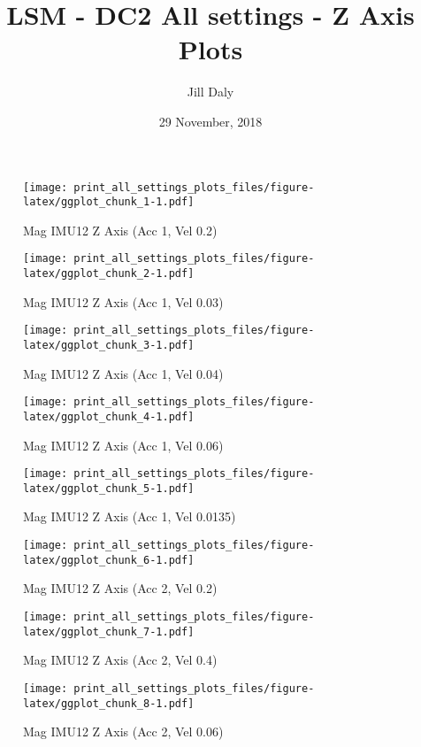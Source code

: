 \documentclass[]{article}
\title{LSM - DC2 All settings - Z Axis Plots}
\author{Jill Daly}
\date{29 November, 2018}
\begin{document}
\maketitle

\begin{figure}
\centering
\texttt{[image: print\_all\_settings\_plots\_files/figure-latex/ggplot\_chunk\_1-1.pdf]}
\caption{Mag IMU12 Z Axis (Acc 1, Vel 0.2)}
\end{figure}

\begin{figure}
\centering
\texttt{[image: print\_all\_settings\_plots\_files/figure-latex/ggplot\_chunk\_2-1.pdf]}
\caption{Mag IMU12 Z Axis (Acc 1, Vel 0.03)}
\end{figure}

\begin{figure}
\centering
\texttt{[image: print\_all\_settings\_plots\_files/figure-latex/ggplot\_chunk\_3-1.pdf]}
\caption{Mag IMU12 Z Axis (Acc 1, Vel 0.04)}
\end{figure}

\begin{figure}
\centering
\texttt{[image: print\_all\_settings\_plots\_files/figure-latex/ggplot\_chunk\_4-1.pdf]}
\caption{Mag IMU12 Z Axis (Acc 1, Vel 0.06)}
\end{figure}

\begin{figure}
\centering
\texttt{[image: print\_all\_settings\_plots\_files/figure-latex/ggplot\_chunk\_5-1.pdf]}
\caption{Mag IMU12 Z Axis (Acc 1, Vel 0.0135)}
\end{figure}

\begin{figure}
\centering
\texttt{[image: print\_all\_settings\_plots\_files/figure-latex/ggplot\_chunk\_6-1.pdf]}
\caption{Mag IMU12 Z Axis (Acc 2, Vel 0.2)}
\end{figure}

\begin{figure}
\centering
\texttt{[image: print\_all\_settings\_plots\_files/figure-latex/ggplot\_chunk\_7-1.pdf]}
\caption{Mag IMU12 Z Axis (Acc 2, Vel 0.4)}
\end{figure}

\begin{figure}
\centering
\texttt{[image: print\_all\_settings\_plots\_files/figure-latex/ggplot\_chunk\_8-1.pdf]}
\caption{Mag IMU12 Z Axis (Acc 2, Vel 0.06)}
\end{figure}
\end{document}
